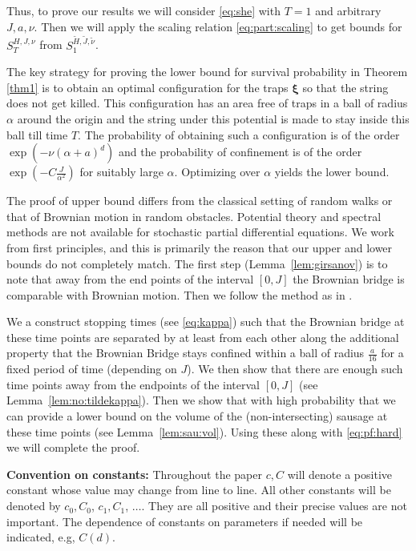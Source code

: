 \documentclass[12pt]{amsart}
\numberwithin{equation}{section}
\theoremstyle{definition}
\numberwithin{equation}{section}
\begin{document}
Thus, to prove our results we will consider \eqref{eq:she} with $T=1$
and arbitrary $J, a, \nu$. Then we will apply the scaling relation
\eqref{eq:part:scaling} to get bounds for $S_T^{H, J,\nu}$ from
$S_1^{\tilde H, \tilde J, \tilde\nu}$.

The key strategy for proving the lower bound for survival probability in Theorem \ref{thm1} is to  obtain  an optimal configuration for the traps ${\mathbf \xi}$ so that the string does not get killed. This configuration has an area free of traps in a ball of radius $\alpha$ around the origin and the string under this potential is made to stay inside this ball till time $T$. The probability of obtaining such a configuration is of the order $\exp(-\nu(\alpha+a)^d)$ and the probability of confinement is of the order $\exp(-C\frac{J}{\alpha^2})$ for suitably large $\alpha$. Optimizing over $\alpha$ yields the lower bound.

The proof of upper bound differs from the classical setting of random
walks or that of Brownian motion in random obstacles.  Potential
theory and spectral methods are not available for stochastic partial
differential equations.  We work from first principles, and this is
primarily the reason that our upper and lower bounds do not completely
match.  The first step (Lemma~\ref{lem:girsanov}) is to note that away
from the end points of the interval $[0,J]$ the Brownian bridge is
comparable with Brownian motion. Then we follow the method as in \cite{ajm23}.

 We a construct stopping times (see \eqref{eq:kappa}) such that the
 Brownian bridge at these time points are separated by at least from
 each other along the additional property that the Brownian Bridge
 stays confined within a ball of radius $\frac{a}{16}$ for a fixed
 period of time (depending on $J$). We then show that there are enough
 such time points away from the endpoints of the interval $[0,J]$ (see
 Lemma~\ref{lem:no:tildekappa}). Then we show that with high probability
 that we can provide a lower bound on the volume of the 
 (non-intersecting) sausage at these time points (see
 Lemma~\ref{lem:sau:vol}). Using these along with \eqref{eq:pf:hard}
 we will complete the proof.


{\bf Convention on constants:} Throughout the paper $c,C$ will denote a positive constant whose value may change from line to line. All other constants will be denoted by $c_0,C_0$, $c_1, C_1$, $\ldots$. They are all positive and their precise values are not important. The dependence of constants on parameters if needed will be indicated, e.g, $C(d)$.
\end{document}
